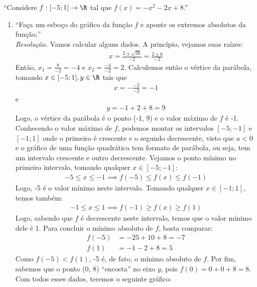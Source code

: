 \enquote{Considere $f: [-5; 1] \rightarrow \R$ tal que $f(x) = -x^2 -2x + 8$.}
\begin{enumerate}
    \item \enquote{Faça um esboço do gráfico da função $f$ e aponte os extremos absolutos da função;} \\
    \emph{Resolução.} Vamos calcular alguns dados. A princípio, vejamos suas raízes:
    \begin{align*}
        x = \frac{2 \pm \sqrt{36}}{-2} = \frac{2 \pm 6}{-2}
    \end{align*} 
    Então, $x_1 = \frac{8}{-2} = -4$ e $x_2 = \frac{-4}{-2} = 2$.
    Calculemos então o vértice da parábola, tomando $x \in [-5; 1], y \in \R$ tais que
    \begin{align*}
        x = -\frac{-2}{-2} = -1
    \end{align*}
    e 
    \begin{align*}
        y = -1 + 2 + 8 = 9
    \end{align*}
    Logo, o vértice da parábola é o ponto (-1, 9) e o valor máximo de $f$ é -1. \\
    Conhecendo o valor máximo de $f$, podemos montar os intervalos $[-5; -1]$ e $[-1; 1]$ onde o primeiro é crescente e o segundo decrescente, visto que $a < 0$ e o gráfico de uma função quadrática tem formato de parábola, ou seja, tem um intervalo crescente e outro decrescente.
    Vejamos o ponto mínimo no primeiro intervalo, tomando qualquer $x \in [-5; -1]$:
    \begin{align*}
        -5 \le x \le -1 \implies f(-5) \le f(x) \le f(-1)
    \end{align*}
    Logo, -5 é o valor mínimo neste intervalo. Tomando qualquer $x \in [-1; 1]$, temos também:
    \begin{align*}
        -1 \le x \le 1 \implies f(-1) \ge f(x) \ge f(1)
    \end{align*}
    Logo, sabendo que $f$ é decrescente neste intervalo, temos que o valor mínimo dele é 1. Para concluir o mínimo absoluto de $f$, basta comparar:
    \begin{align*}
        f(-5) &= -25 + 10 + 8 = -7 \\
        f(1) &= -1 - 2 + 8 = 5
    \end{align*}
    Como $f(-5) < f(1)$, -5 é, de fato, o mínimo absoluto de $f$.
    Por fim, sabemos que o ponto (0, 8) \enquote{encosta} no eixo $y$, pois $f(0) = 0 + 0 + 8 = 8$. \\
    Com todos esses dados, teremos o seguinte gráfico:

\end{enumerate}

